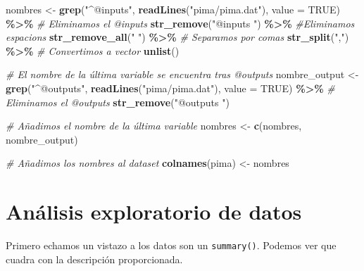 \documentclass[
]{article}
\newenvironment{Shaded}{\begin{snugshade}}{\end{snugshade}}
\newcommand{\AttributeTok}[1]{\textcolor[rgb]{0.13,0.29,0.53}{#1}}
\newcommand{\CommentTok}[1]{\textcolor[rgb]{0.56,0.35,0.01}{\textit{#1}}}
\newcommand{\ConstantTok}[1]{\textcolor[rgb]{0.56,0.35,0.01}{#1}}
\newcommand{\FunctionTok}[1]{\textcolor[rgb]{0.13,0.29,0.53}{\textbf{#1}}}
\newcommand{\NormalTok}[1]{#1}
\newcommand{\OtherTok}[1]{\textcolor[rgb]{0.56,0.35,0.01}{#1}}
\newcommand{\SpecialCharTok}[1]{\textcolor[rgb]{0.81,0.36,0.00}{\textbf{#1}}}
\newcommand{\StringTok}[1]{\textcolor[rgb]{0.31,0.60,0.02}{#1}}
\begin{document}
\begin{Shaded}
\begin{Highlighting}[]
\NormalTok{nombres }\OtherTok{\textless{}{-}} \FunctionTok{grep}\NormalTok{(}\StringTok{"\^{}@inputs"}\NormalTok{, }\FunctionTok{readLines}\NormalTok{(}\StringTok{"pima/pima.dat"}\NormalTok{), }\AttributeTok{value =} \ConstantTok{TRUE}\NormalTok{) }\SpecialCharTok{\%\textgreater{}\%} 
  \CommentTok{\# Eliminamos el @inputs}
  \FunctionTok{str\_remove}\NormalTok{(}\StringTok{"@inputs "}\NormalTok{) }\SpecialCharTok{\%\textgreater{}\%} 
  \CommentTok{\#Eliminamos espacions}
  \FunctionTok{str\_remove\_all}\NormalTok{(}\StringTok{" "}\NormalTok{) }\SpecialCharTok{\%\textgreater{}\%}
  \CommentTok{\# Separamos por comas}
  \FunctionTok{str\_split}\NormalTok{(}\StringTok{","}\NormalTok{) }\SpecialCharTok{\%\textgreater{}\%} 
  \CommentTok{\# Convertimos a vector}
  \FunctionTok{unlist}\NormalTok{()}

\CommentTok{\# El nombre de la última variable se encuentra tras @outputs}
\NormalTok{nombre\_output }\OtherTok{\textless{}{-}} \FunctionTok{grep}\NormalTok{(}\StringTok{"\^{}@outputs"}\NormalTok{, }\FunctionTok{readLines}\NormalTok{(}\StringTok{"pima/pima.dat"}\NormalTok{), }\AttributeTok{value =} \ConstantTok{TRUE}\NormalTok{) }\SpecialCharTok{\%\textgreater{}\%} 
  \CommentTok{\# Eliminamos el @outputs}
  \FunctionTok{str\_remove}\NormalTok{(}\StringTok{"@outputs "}\NormalTok{)}

\CommentTok{\# Añadimos el nombre de la última variable}
\NormalTok{nombres }\OtherTok{\textless{}{-}} \FunctionTok{c}\NormalTok{(nombres, nombre\_output)}

\CommentTok{\# Añadimos los nombres al dataset}
\FunctionTok{colnames}\NormalTok{(pima) }\OtherTok{\textless{}{-}}\NormalTok{ nombres}
\end{Highlighting}
\end{Shaded}

\hypertarget{anuxe1lisis-exploratorio-de-datos}{%
\section{Análisis exploratorio de
datos}\label{anuxe1lisis-exploratorio-de-datos}}

Primero echamos un vistazo a los datos son un \texttt{summary()}.
Podemos ver que cuadra con la descripción proporcionada.
\end{document}
